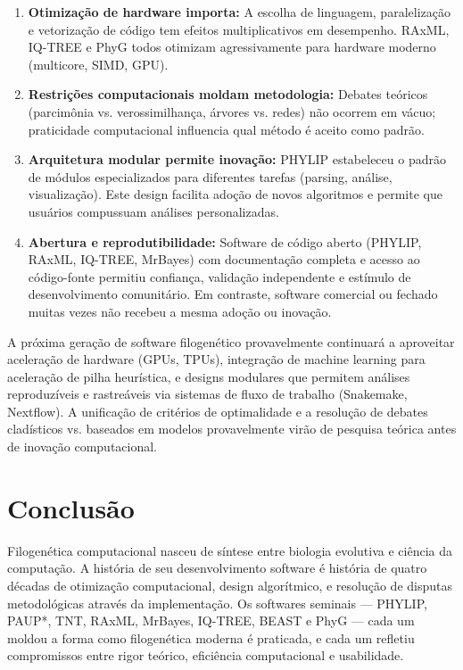 \begin{enumerate}
\item \textbf{Otimização de hardware importa:} A escolha de linguagem, paralelização e vetorização de código tem efeitos multiplicativos em desempenho. RAxML, IQ-TREE e PhyG todos otimizam agressivamente para hardware moderno (multicore, SIMD, GPU).

\item \textbf{Restrições computacionais moldam metodologia:} Debates teóricos (parcimônia vs. verossimilhança, árvores vs. redes) não ocorrem em vácuo; praticidade computacional influencia qual método é aceito como padrão.

\item \textbf{Arquitetura modular permite inovação:} PHYLIP estabeleceu o padrão de módulos especializados para diferentes tarefas (parsing, análise, visualização). Este design facilita adoção de novos algoritmos e permite que usuários compussuam análises personalizadas.

\item \textbf{Abertura e reprodutibilidade:} Software de código aberto (PHYLIP, RAxML, IQ-TREE, MrBayes) com documentação completa e acesso ao código-fonte permitiu confiança, validação independente e estímulo de desenvolvimento comunitário. Em contraste, software comercial ou fechado muitas vezes não recebeu a mesma adoção ou inovação.

\end{enumerate}

A próxima geração de software filogenético provavelmente continuará a aproveitar aceleração de hardware (GPUs, TPUs), integração de machine learning para aceleração de pilha heurística, e designs modulares que permitem análises reproduzíveis e rastreáveis via sistemas de fluxo de trabalho (Snakemake, Nextflow). A unificação de critérios de optimalidade e a resolução de debates cladísticos vs. baseados em modelos provavelmente virão de pesquisa teórica antes de inovação computacional.

\section{Conclusão}

Filogenética computacional nasceu de síntese entre biologia evolutiva e ciência da computação. A história de seu desenvolvimento software é história de quatro décadas de otimização computacional, design algorítmico, e resolução de disputas metodológicas através da implementação. Os softwares seminais --- PHYLIP, PAUP*, TNT, RAxML, MrBayes, IQ-TREE, BEAST e PhyG --- cada um moldou a forma como filogenética moderna é praticada, e cada um refletiu compromissos entre rigor teórico, eficiência computacional e usabilidade.


